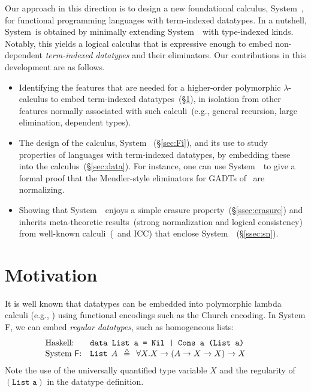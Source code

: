 Our approach in this direction is to design a new foundational calculus,
System~\Fi, for functional programming languages with term-indexed
datatypes.  In a nutshell, System~\Fi is obtained by minimally extending
System~\Fw\ with type-indexed kinds.  Notably, this yields a logical
calculus that is expressive enough to embed non-dependent
\emph{term-indexed datatypes} and their eliminators. Our contributions in
this development are as follows.\vspace*{-5pt}
\begin{itemize}
\item 
  Identifying the features that are needed for a higher-order polymorphic
  $\lambda$-calculus to embed term-indexed datatypes~(\S\ref{sec:motiv}),
  in isolation from other features normally associated with such
  calculi~(e.g., general recursion, large elimination, dependent types).
  \vspace*{-1pt}
\item 
  The design of the calculus, System \Fi\ (\S\ref{sec:Fi}), and its use to
  study properties of languages with term-indexed datatypes, by embedding
  these into the calculus~(\S\ref{sec:data}).  For instance, one can use
  System~\Fi\ to give a formal proof that the Mendler-style eliminators
  for GADTs of~\cite{AhnShe11} are normalizing.
  \vspace*{-1pt}
\item 
  Showing that System~\Fi\ enjoys a simple erasure
  property~(\S\ref{ssec:erasure}) and inherits meta-theoretic
  results~(strong normalization and logical consistency) from well-known
  calculi~(\Fw\ and ICC) that enclose System~\Fi~(\S\ref{ssec:sn}).
\end{itemize}\vspace*{-3pt}


\section{Motivation}
\label{sec:motiv}
It is well known that datatypes can be embedded into polymorphic lambda calculi
(e.g., \cite{AbeMatUus03}) using
functional encodings such as the Church encoding.
In System \textsf{F}, we can embed \emph{regular datatypes},
such as homogeneous lists:
\[\!\!\!\!\!\!\!\!\!
\begin{array}{ll}
\text{Haskell:} & \texttt{data List a = Nil | Cons a (List a)} \\
\text{System \textsf{F}:} & \texttt{{List}}\:\: A\:\:\triangleq\:\:\forall X.X\to(A\to X\to X)\to X ~~\;
\end{array}
\]
Note the use of the universally quantified type variable $X$
and the regularity of $(\texttt{List a})$ in the datatype definition.

